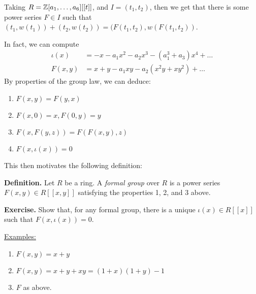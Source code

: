 \documentclass[10pt,a4paper]{article}
\begin{document}
Taking $R = \mathbb{Z}[a_1, \ldots, a_6][[t]]$, and $I=(t_1, t_2)$, then we get that there is some power series $F \in I$ such that $(t_1,w(t_1))+(t_2,w(t_2)) = (F(t_1,t_2),w(F(t_1,t_2))$.

In fact, we can compute
\begin{align*}
  \iota(x) &= -x-a_1x^2-a_2x^3-(a_1^3+a_3)x^4+\ldots\\
  F(x, y) &= x+y-a_1xy-a_2(x^2y+xy^2)+\ldots
\end{align*}
By properties of the group law, we can deduce:
\begin{enumerate}
  \item $F(x, y) = F(y, x)$
  \item $F(x, 0) = x, F(0, y) = y$
  \item $F(x, F(y, z)) = F(F(x, y), z)$
  \item $F(x, \iota(x)) = 0$
\end{enumerate}
This then motivates the following definition:

\textbf{Definition.} Let $R$ be a ring. A \emph{formal group} over $R$ is a power series $F(x, y) \in R[[x, y]]$ satisfying the properties 1, 2, and 3 above.

\textbf{Exercise.} Show that, for any formal group, there is a unique $\iota(x) \in R[[x]]$ such that \mbox{$F(x,\iota(x)) = 0$}.

\underline{Examples:}
\begin{enumerate}
  \item $F(x, y) = x + y$
  \item $F(x, y) = x + y + x y = (1 + x)(1 + y) - 1$
  \item $F$ as above.
\end{enumerate}
\end{document}
